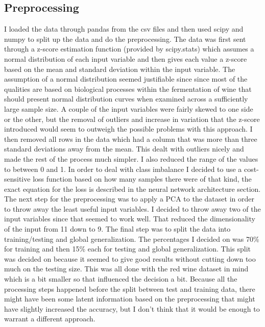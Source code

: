 \documentclass[conference]{IEEEtran}
\begin{document}
\subsection{Preprocessing}
I loaded the data through pandas from the csv files and then used scipy and numpy to split up the data and do the preprocessing.
The data was first sent through a z-score estimation function (provided by scipy.stats) which assumes a normal distribution of each input variable and then gives each value a z-score based on the mean and standard deviation within the input variable.
The assumption of a normal distribution seemed justifiable since since most of the qualities are based on biological processes within the fermentation of wine that should present normal distribution curves when examined across a sufficiently large sample size. A couple of the input variables were fairly skewed to one side or the other, but the removal of outliers and increase in variation that the z-score introduced would seem to outweigh the possible problems with this approach.
I then removed all rows in the data which had a column that was more than three standard deviations away from the mean. This dealt with outliers nicely and made the rest of the process much simpler. I also reduced the range of the values to between 0 and 1. In order to deal with class imbalance I decided to use a cost-sensitive loss function based on how many samples there were of that kind, the exact equation for the loss is described in the neural network architecture section.
The next step for the preprocessing was to apply a PCA to the dataset in order to throw away the least useful input variables. I decided to throw away two of the input variables since that seemed to work well. That reduced the dimensionality of the input from 11 down to 9.
The final step was to split the data into training/testing and global generalization. The percentages I decided on was 70\% for training and then 15\% each for testing and global generalization. This split was decided on because it seemed to give good results without cutting down too much on the testing size. This was all done with the red wine dataset in mind which is a bit smaller so that influenced the decision a bit. Because all the processing steps happened before the split between test and training data, there might have been some latent information based on the preprocessing that might have slightly increased the accuracy, but I don't think that it would be enough to warrant a different approach.
\end{document}
